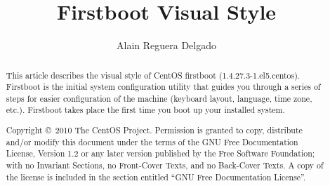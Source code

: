 \documentclass[12pt]{article}
\title{Firstboot Visual Style}
\author{Alain Reguera Delgado}
\begin{document}
\maketitle

\begin{abstract} 

This article describes the visual style of CentOS firstboot
(1.4.27.3-1.el5.centos). Firstboot is the initial system configuration
utility that guides you through a series of steps for easier
configuration of the machine (keyboard layout, language, time zone,
etc.). Firstboot takes place the first time you boot up your installed
system.

Copyright \copyright\ 2010 The CentOS Project. Permission is granted
to copy, distribute and/or modify this document under the terms of the
GNU Free Documentation License, Version 1.2 or any later version
published by the Free Software Foundation; with no Invariant Sections,
no Front-Cover Texts, and no Back-Cover Texts. A copy of the license
is included in the section entitled ``GNU Free Documentation
License''.  

\end{abstract}

\tableofcontents








\end{document}
